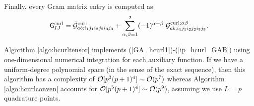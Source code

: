 Finally, every Gram matrix entry is computed as
%
\begin{equation}
    \mathsf{G}_{IJ}^{\operatorname{curl}}=
    \check{\mathcal{G}}^{\operatorname{curl}}_{ab;i_1j_1i_2j_2i_3j_3}+ \sum\limits_{\alpha,\beta=1}^{2}(-1)^{\alpha+\beta}\;\mathcal{G}^{\operatorname{curl};\alpha \beta}_{ab;i_1j_1i_2j_2i_3j_3}.
    \label{ip_hcurl_GAB}
\end{equation}

Algorithm \ref{algo:hcurltensor} implements (\ref{GA_hcurl1})-(\ref{ip_hcurl_GAB}) using one-dimensional numerical integration for each auxiliary function. If we have a uniform-degree polynomial space (in the sense of the exact sequence), then this algorithm has a complexity of $\mathcal{O}[p^3(p+1)^4]\sim \mathcal{O}(p^7)$ whereas Algorithm \ref{algo:hcurlconven} accounts for $\mathcal{O}[p^5(p+1)^4]\sim \mathcal{O}(p^9)$, assuming we use $L=p$ quadrature points.
%

